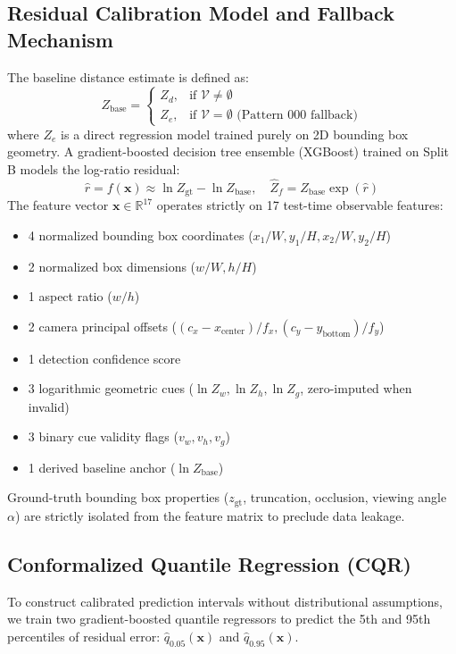 \documentclass[]{spie}  %
\begin{document}
\subsection{Residual Calibration Model and Fallback Mechanism}
The baseline distance estimate is defined as:
\begin{equation}
Z_{\text{base}} = \begin{cases} Z_d, & \text{if } \mathcal{V} \neq \emptyset \\ Z_e, & \text{if } \mathcal{V} = \emptyset \text{ (Pattern 000 fallback)} \end{cases}
\end{equation}
where $Z_e$ is a direct regression model trained purely on 2D bounding box geometry. A gradient-boosted decision tree ensemble (XGBoost)\cite{chen2016xgboost} trained on Split B models the log-ratio residual:
\begin{equation}
\hat{r} = f(\mathbf{x}) \approx \ln Z_{\text{gt}} - \ln Z_{\text{base}}, \quad \hat{Z}_f = Z_{\text{base}} \exp(\hat{r})
\end{equation}
The feature vector $\mathbf{x} \in \mathbb{R}^{17}$ operates strictly on 17 test-time observable features:
\begin{itemize}
    \item 4 normalized bounding box coordinates ($x_1/W, y_1/H, x_2/W, y_2/H$)
    \item 2 normalized box dimensions ($w/W, h/H$)
    \item 1 aspect ratio ($w/h$)
    \item 2 camera principal offsets ($(c_x - x_{\text{center}})/f_x, (c_y - y_{\text{bottom}})/f_y$)
    \item 1 detection confidence score
    \item 3 logarithmic geometric cues ($\ln Z_w, \ln Z_h, \ln Z_g$, zero-imputed when invalid)
    \item 3 binary cue validity flags ($v_w, v_h, v_g$)
    \item 1 derived baseline anchor ($\ln Z_{\text{base}}$)
\end{itemize}
Ground-truth bounding box properties ($z_{\text{gt}}$, truncation, occlusion, viewing angle $\alpha$) are strictly isolated from the feature matrix to preclude data leakage.

\subsection{Conformalized Quantile Regression (CQR)}
To construct calibrated prediction intervals without distributional assumptions, we train two gradient-boosted quantile regressors to predict the 5th and 95th percentiles of residual error: $\hat{q}_{0.05}(\mathbf{x})$ and $\hat{q}_{0.95}(\mathbf{x})$.
\end{document}
